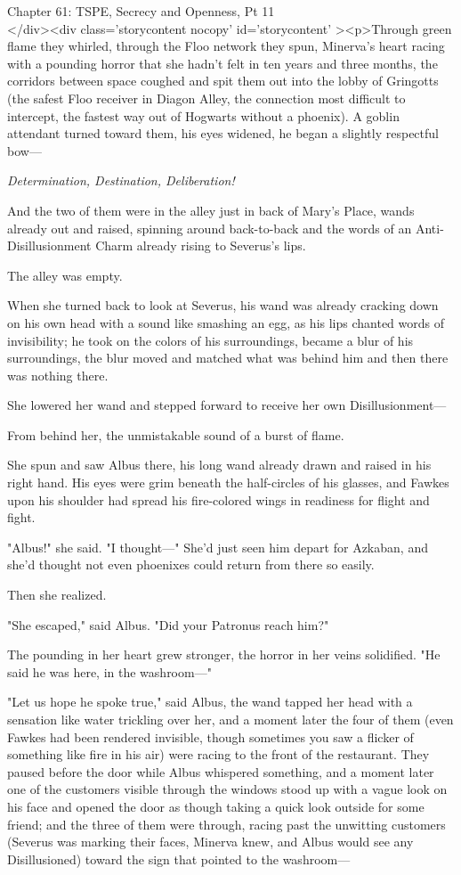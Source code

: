 
Chapter 61: TSPE, Secrecy and Openness, Pt 11\\
</div><div  class='storycontent nocopy' id='storycontent' ><p>Through green 
flame they whirled, through the Floo network they spun, Minerva's heart racing 
with a pounding horror that she hadn't felt in ten years and three months, the 
corridors between space coughed and spit them out into the lobby of Gringotts 
(the safest Floo receiver in Diagon Alley, the connection most difficult to 
intercept, the fastest way out of Hogwarts without a phoenix). A goblin 
attendant turned toward them, his eyes widened, he began a slightly respectful 
bow---

\emph{Determination, Destination, Deliberation!}

And the two of them were in the alley just in back of Mary's Place, wands 
already out and raised, spinning around back-to-back and the words of an 
Anti-Disillusionment Charm already rising to Severus's lips.

The alley was empty.

When she turned back to look at Severus, his wand was already cracking down on 
his own head with a sound like smashing an egg, as his lips chanted words of 
invisibility; he took on the colors of his surroundings, became a blur of his 
surroundings, the blur moved and matched what was behind him and then there was 
nothing there.

She lowered her wand and stepped forward to receive her own Disillusionment---

From behind her, the unmistakable sound of a burst of flame.

She spun and saw Albus there, his long wand already drawn and raised in his 
right hand. His eyes were grim beneath the half-circles of his glasses, and 
Fawkes upon his shoulder had spread his fire-colored wings in readiness for 
flight and fight.

"Albus!" she said. "I thought---" She'd just seen him depart for Azkaban, and 
she'd thought not even phoenixes could return from there so easily.

Then she realized.

"She escaped," said Albus. "Did your Patronus reach him?"

The pounding in her heart grew stronger, the horror in her veins solidified. 
"He said he was here, in the washroom---"

"Let us hope he spoke true," said Albus, the wand tapped her head with a 
sensation like water trickling over her, and a moment later the four of them 
(even Fawkes had been rendered invisible, though sometimes you saw a flicker of 
something like fire in his air) were racing to the front of the restaurant. 
They paused before the door while Albus whispered something, and a moment later 
one of the customers visible through the windows stood up with a vague look on 
his face and opened the door as though taking a quick look outside for some 
friend; and the three of them were through, racing past the unwitting customers 
(Severus was marking their faces, Minerva knew, and Albus would see any 
Disillusioned) toward the sign that pointed to the washroom---


